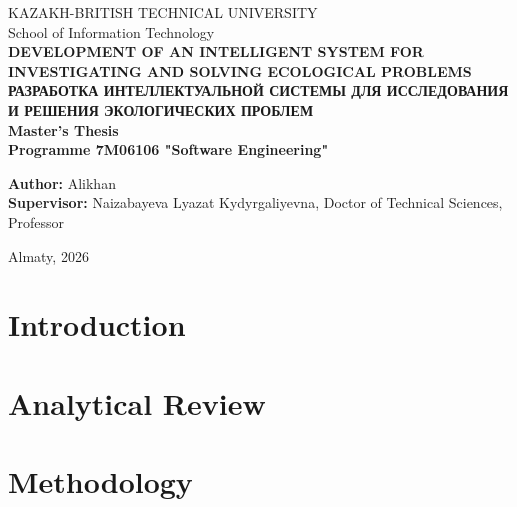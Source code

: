 \documentclass[14pt, a4paper, oneside]{extreport}
\numberwithin{equation}{chapter}
\numberwithin{figure}{chapter}
\numberwithin{table}{chapter}
\newcommand{\ThesisTitleEN}{Development of an intelligent system for investigating and solving ecological problems}
\newcommand{\ThesisTitleRU}{Разработка интеллектуальной системы для исследования и решения экологических проблем}
\newcommand{\AuthorName}{Alikhan}
\newcommand{\SupervisorName}{Naizabayeva Lyazat Kydyrgaliyevna, Doctor of Technical Sciences, Professor}
\newcommand{\DefenceYear}{2026}
\newcommand{\ProgramCode}{7M06106}
\newcommand{\ProgramName}{Software Engineering}
\newcommand{\University}{Kazakh-British Technical University}
\begin{document}
\thispagestyle{nonum}
\begin{titlepage}
  \centering
  \fontsize{14}{16}\selectfont
  \MakeUppercase{\University}\\[6pt]
  School of Information Technology\\[24pt]

  \fontsize{16}{18}\selectfont\bfseries
  \MakeUppercase{\ThesisTitleEN}\\[6pt]
  \MakeUppercase{\ThesisTitleRU}\\[24pt]

  \fontsize{14}{16}\selectfont\mdseries
  Master's Thesis\\
  Programme \ProgramCode{} "\ProgramName"\\[48pt]

  \begin{flushleft}
    \textbf{Author:} \AuthorName\\[6pt]
    \textbf{Supervisor:} \SupervisorName\\[6pt]
  \end{flushleft}

  \vfill
  Almaty, \DefenceYear
\end{titlepage}

\thispagestyle{nonum}

\clearpage

\thispagestyle{nonum}
\tableofcontents
\clearpage

\setcounter{page}{4}   %
\pagestyle{fancy}

\chapter*{Introduction}


\chapter{Analytical Review}


\chapter{Methodology}

\end{document}
